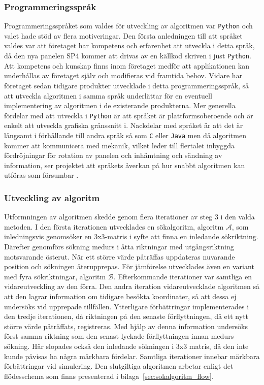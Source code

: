         \subsubsection{Programmeringsspråk} %
        \label{ssub:programmeringssprak}
            Programmeringsspråket som valdes för utveckling av algoritmen var \texttt{Python} och valet hade stöd av flera motiveringar. Den första anledningen till att språket valdes var att företaget har kompetens och erfarenhet att utveckla i detta språk, då den nya panelen SP4 kommer att drivas av en källkod skriven i just \texttt{Python}. Att kompetens och kunskap finns inom företaget medför att applikationen kan underhållas av företaget själv och modifieras vid framtida behov. Vidare har företaget sedan tidigare produkter utvecklade i detta programmeringsspråk, så att utveckla algoritmen i samma språk underlättar för en eventuell implementering av algoritmen i de existerande produkterna. Mer generella fördelar med att utveckla i \texttt{Python} är att språket är plattformsoberoende och är enkelt att utveckla grafiska gränssnitt i. Nackdelar med språket är att det är långsamt i förhållande till andra språk så som \texttt{C} eller \texttt{Java} men då algoritmen kommer att kommunicera med mekanik, vilket leder till flertalet inbyggda fördröjningar för rotation av panelen och inhämtning och sändning av information, ser projektet att språkets åverkan på hur snabbt algoritmen kan utföras som försumbar \cite{python_speed}. %

        \subsubsection{Utveckling av algoritm} %
        \label{ssub:utveckling_av_algoritm}
            Utformningen av algoritmen skedde genom flera iterationer av steg 3 i den valda metoden. I den första iterationen utvecklades en sökalgoritm, algoritm $\mathscr{A}$, som inledningsvis genomsöker en 3x3-matris i syfte att finna en inledande sökriktning. Därefter genomförs sökning medurs i åtta riktningar med utgångsriktning motsvarande österut. När ett större värde påträffas uppdateras nuvarande position och sökningen återupprepas. För jämförelse utvecklades även en variant med fyra sökriktningar, algoritm $\mathscr{B}$. Efterkommande iterationer var samtliga en vidareutveckling av den förra. Den andra iteration vidareutvecklade algoritmen så att den lagrar information om tidigare besökta koordinater, så att dessa ej undersöks vid upprepade tillfällen. Ytterligare förbättringar implementerades i den tredje iterationen, då riktningen på den senaste förflyttningen, då ett nytt större värde påträffats, registreras. Med hjälp av denna information undersöks först samma riktning som den senast lyckade förflyttningen innan medurs sökning. Här slopades också den inledande sökningen i 3x3 matris, då den inte kunde påvisas ha några märkbara fördelar. Samtliga iterationer innebar märkbara förbättringar vid simulering. Den slutgiltiga algoritmen arbetar enligt det flödesschema som finns presenterad i bilaga~\ref{sec:sokalgoritm_flow}. %

